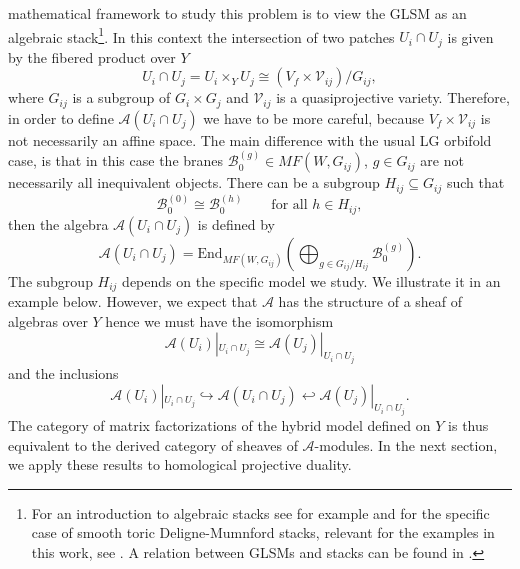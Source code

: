 \documentclass[a4paper,11pt]{article}
\numberwithin{equation}{section}
\begin{document}
mathematical framework to study this problem is to view the GLSM as an 
algebraic stack\footnote{For an introduction to algebraic stacks see for 
example \cite{gomez2001algebraic} and for the specific case of smooth toric 
Deligne-Mumnford stacks, relevant for the examples in this work, see 
\cite{fantechi2010smooth}. A relation between GLSMs and stacks can be found in 
\cite{Pantev:2005zs}.}. In this context the intersection of two patches $U_i 
\cap U_j$ is given by the fibered product over $Y$
\begin{equation}
U_i 
\cap U_j=U_i 
\times_{Y} U_j\cong (V_{f}\times\mathcal{V}_{ij})/G_{ij},
\end{equation}
where $G_{ij}$ is a subgroup of $G_{i}\times G_{j}$ and $\mathcal{V}_{ij}$ is a 
quasiprojective variety.  Therefore, in order to define $\mathcal{A}(U_i 
\cap U_j)$ we have to be more careful, because $V_{f}\times\mathcal{V}_{ij}$ is 
not necessarily an affine space. The main difference with the usual LG orbifold 
case, is that in this case the branes $\mathcal{B}_{0}^{(g)}\in MF(W,G_{ij})$, 
$g\in G_{ij}$ are not necessarily all inequivalent objects. There can be a 
subgroup $H_{ij}\subseteq G_{ij}$ such that
\begin{equation}
\mathcal{B}_{0}^{(0)}\cong \mathcal{B}_{0}^{(h)}\qquad \text{for all \ }h\in 
H_{ij}, 
\end{equation}
then the algebra $\mathcal{A}(U_i \cap U_j)$ is defined by
\begin{equation}
\mathcal{A}(U_i \cap U_j)=\mathrm{End}_{MF(W,G_{ij})}\left(\bigoplus_{g\in 
G_{ij}/H_{ij}}\mathcal{B}_{0}^{(g)}\right).
\end{equation}
The subgroup $H_{ij}$ depends on the specific model we study. We illustrate it 
in an example below. However, we expect that $\mathcal{A}$ has the structure 
of a sheaf of algebras over $Y$ hence we must have the isomorphism
\begin{equation}\label{interisom}
\mathcal{A}(U_i)|_{U_i \cap U_j} \cong \mathcal{A}(U_j)|_{U_i \cap U_j}
\end{equation}
and the inclusions
\begin{equation}\label{interisom}
\mathcal{A}(U_i)|_{U_i \cap U_j} \hookrightarrow \mathcal{A}(U_i \cap 
U_j)\hookleftarrow \mathcal{A}(U_j)|_{U_i \cap U_j}.
\end{equation}
The category of matrix factorizations of the hybrid model defined on $Y$ is thus equivalent to the derived category of sheaves of $\mathcal{A}$-modules. In the next section, we apply these results to homological projective duality.
\end{document}
